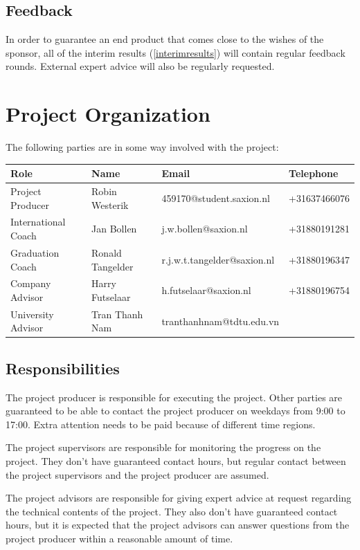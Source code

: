 \documentclass[11pt, a4paper]{article}
\begin{document}
\subsection{Feedback}
In order to guarantee an end product that comes close to the wishes of the sponsor, all of the interim results (\ref{interimresults}) will contain regular feedback rounds. External expert advice will also be regularly requested.
\pagebreak
\section{Project Organization}\label{projectorganization}
The following parties are in some way involved with the project:\\

\begin{tabular}{ | l | l | l | l |}
    \hline
    \textbf{Role} & \textbf{Name} & \textbf{Email} & \textbf{Telephone} \\ \hline
    Project Producer & Robin Westerik & 459170@student.saxion.nl & +31637466076 \\
    International Coach & Jan Bollen & j.w.bollen@saxion.nl & +31880191281\\
    Graduation Coach & Ronald Tangelder & r.j.w.t.tangelder@saxion.nl & +31880196347\\
    Company Advisor & Harry Futselaar & h.futselaar@saxion.nl & +31880196754\\
    University Advisor & Tran Thanh Nam & tranthanhnam@tdtu.edu.vn & \\
    \hline
\end{tabular}

\subsection{Responsibilities}
The project producer is responsible for executing the project. Other parties are guaranteed to be able to contact the project producer on weekdays from 9:00 to 17:00. Extra attention needs to be paid because of different time regions.

The project supervisors are responsible for monitoring the progress on the project. They don't have guaranteed contact hours, but regular contact between the project supervisors and the project producer are assumed.

The project advisors are responsible for giving expert advice at request regarding the technical contents of the project. They also don't have guaranteed contact hours, but it is expected that the project advisors can answer questions from the project producer within a reasonable amount of time.
\end{document}
